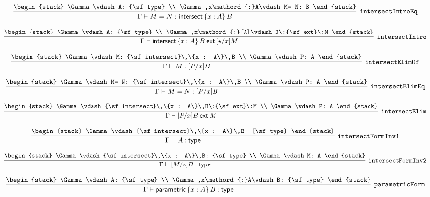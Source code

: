 \[
\infer[{\tt intersectIntroEq}]{\Gamma \vdash M= N: {\sf intersect}\,\{x : A\}\,B}{
\begin{stack}
\Gamma \vdash A: {\sf type}
\\
\Gamma ,x\mathord{:}A\vdash M= N: B
\end{stack}}
\]

\[
\infer[{\tt intersectIntro}]{\Gamma \vdash {\sf intersect}\,\{x : A\}\,B\:{\sf ext}\:[\star /x]M}{
\begin{stack}
\Gamma \vdash A: {\sf type}
\\
\Gamma ,x\mathord{:}[A]\vdash B\:{\sf ext}\:M
\end{stack}}
\]

\[
\infer[{\tt intersectElimOf}]{\Gamma \vdash M: [P/x]B}{
\begin{stack}
\Gamma \vdash M: {\sf intersect}\,\{x : A\}\,B
\\
\Gamma \vdash P: A
\end{stack}}
\]

\[
\infer[{\tt intersectElimEq}]{\Gamma \vdash M= N: [P/x]B}{
\begin{stack}
\Gamma \vdash M= N: {\sf intersect}\,\{x : A\}\,B
\\
\Gamma \vdash P: A
\end{stack}}
\]

\[
\infer[{\tt intersectElim}]{\Gamma \vdash [P/x]B\:{\sf ext}\:M}{
\begin{stack}
\Gamma \vdash {\sf intersect}\,\{x : A\}\,B\:{\sf ext}\:M
\\
\Gamma \vdash P: A
\end{stack}}
\]

\[
\infer[{\tt intersectFormInv1}]{\Gamma \vdash A: {\sf type}}{
\begin{stack}
\Gamma \vdash {\sf intersect}\,\{x : A\}\,B: {\sf type}
\end{stack}}
\]

\[
\infer[{\tt intersectFormInv2}]{\Gamma \vdash [M/x]B: {\sf type}}{
\begin{stack}
\Gamma \vdash {\sf intersect}\,\{x : A\}\,B: {\sf type}
\\
\Gamma \vdash M: A
\end{stack}}
\]

\[
\infer[{\tt parametricForm}]{\Gamma \vdash {\sf parametric}\,\{x : A\}\,B: {\sf type}}{
\begin{stack}
\Gamma \vdash A: {\sf type}
\\
\Gamma ,x\mathord{:}A\vdash B: {\sf type}
\end{stack}}
\]


